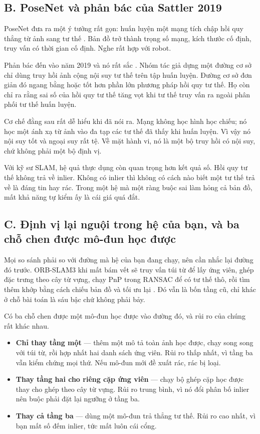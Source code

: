 \documentclass[../../deep_learning.tex]{subfiles}
\begin{document}
\subsection{B. PoseNet và phản bác của Sattler 2019}
PoseNet đưa ra một ý tưởng rất gọn: huấn luyện một mạng tích chập hồi quy thẳng từ ảnh sang tư thế \cite{f29kendall2015posenet}. Bản đồ trở thành trọng số mạng, kích thước cố định, truy vấn có thời gian cố định. Nghe rất hợp với robot.

Phản bác đến vào năm 2019 và nó rất sắc \cite{f29sattler2019understanding}. Nhóm tác giả dựng một đường cơ sở chỉ dùng truy hồi ảnh cộng nội suy tư thế trên tập huấn luyện. Đường cơ sở đơn giản đó ngang bằng hoặc tốt hơn phần lớn phương pháp hồi quy tư thế. Họ còn chỉ ra rằng sai số của hồi quy tư thế tăng vọt khi tư thế truy vấn ra ngoài phân phối tư thế huấn luyện.

Cơ chế đằng sau rất dễ hiểu khi đã nói ra. Mạng không học hình học chiếu; nó học một ánh xạ từ ảnh vào đa tạp các tư thế đã thấy khi huấn luyện. Vì vậy nó nội suy tốt và ngoại suy rất tệ. Về mặt hành vi, nó là một bộ truy hồi có nội suy, chứ không phải một bộ định vị.

Với kỹ sư SLAM, hệ quả thực dụng còn quan trọng hơn kết quả số. Hồi quy tư thế không trả về inlier. Không có inlier thì không có cách nào biết một tư thế trả về là đáng tin hay rác. Trong một hệ mà một ràng buộc sai làm hỏng cả bản đồ, mất khả năng tự kiểm ấy là cái giá quá đắt.

\subsection{C. Định vị lại nguội trong hệ của bạn, và ba chỗ chen được mô-đun học được}
Mọi so sánh phải so với đường mà hệ của bạn đang chạy, nên cần nhắc lại đường đó trước. ORB-SLAM3 khi mất bám vết sẽ truy vấn túi từ để lấy ứng viên, ghép đặc trưng theo cây từ vựng, chạy PnP trong RANSAC để có tư thế thô, rồi tìm thêm khớp bằng cách chiếu bản đồ và tối ưu lại \cite{campos2021orbslam3}. Đó vẫn là bốn tầng cũ, chỉ khác ở chỗ bài toán là sáu bậc chứ không phải bảy.

Có ba chỗ chen được một mô-đun học được vào đường đó, và rủi ro của chúng rất khác nhau.

\begin{itemize}
\item \textbf{Chỉ thay tầng một} --- thêm một mô tả toàn ảnh học được, chạy song song với túi từ, rồi hợp nhất hai danh sách ứng viên. Rủi ro thấp nhất, vì tầng ba vẫn kiểm chứng mọi thứ. Nếu mô-đun mới đề xuất rác, rác bị loại.
\item \textbf{Thay tầng hai cho riêng cặp ứng viên} --- chạy bộ ghép cặp học được thay cho ghép theo cây từ vựng. Rủi ro trung bình, vì nó đổi phân bố inlier nên buộc phải đặt lại ngưỡng ở tầng ba.
\item \textbf{Thay cả tầng ba} --- dùng một mô-đun trả thẳng tư thế. Rủi ro cao nhất, vì bạn mất số đếm inlier, tức mất luôn cái cổng.
\end{itemize}
\end{document}
